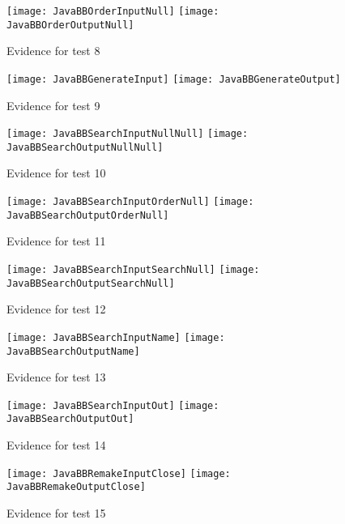 \documentclass[
11pt, %
a4paper, %
oneside, %
headinclude,footinclude, %
BCOR5mm, %
]{scrartcl}
\begin{document}
\begin{appendices}
{{{{{{{{{{{{{{\begin{figure}[H]
	\label{javabbtes7}	
\end{figure}
\begin{figure}[H]
	\centering
	\texttt{[image: JavaBBOrderInputNull]}
	\texttt{[image: JavaBBOrderOutputNull]}
	\caption[Evidence C.2.1 Test 8]{Evidence for test 8}
	\label{javabbtes8}	
\end{figure}
\begin{figure}[H]
	\centering
	\texttt{[image: JavaBBGenerateInput]}
	\texttt{[image: JavaBBGenerateOutput]}
	\caption[Evidence C.2.1 Test 9]{Evidence for test 9}
	\label{javabbtes9}	
\end{figure}
\begin{figure}[H]
	\centering
	\texttt{[image: JavaBBSearchInputNullNull]}
	\texttt{[image: JavaBBSearchOutputNullNull]}
	\caption[Evidence C.2.1 Test 10]{Evidence for test 10}
	\label{javabbtes10}	
\end{figure}
\begin{figure}[H]
	\centering
	\texttt{[image: JavaBBSearchInputOrderNull]}
	\texttt{[image: JavaBBSearchOutputOrderNull]}
	\caption[Evidence C.2.1 Test 11]{Evidence for test 11}
	\label{javabbtes11}	
\end{figure}
\begin{figure}[H]
	\centering
	\texttt{[image: JavaBBSearchInputSearchNull]}
	\texttt{[image: JavaBBSearchOutputSearchNull]}
	\caption[Evidence C.2.1 Test 12]{Evidence for test 12}
	\label{javabbtes12}	
\end{figure}
\begin{figure}[H]
	\centering
	\texttt{[image: JavaBBSearchInputName]}
	\texttt{[image: JavaBBSearchOutputName]}
	\caption[Evidence C.2.1 Test 13]{Evidence for test 13}
	\label{javabbtes13}	
\end{figure}
\begin{figure}[H]
	\centering
	\texttt{[image: JavaBBSearchInputOut]}
	\texttt{[image: JavaBBSearchOutputOut]}
	\caption[Evidence C.2.1 Test 14]{Evidence for test 14}
	\label{javabbtes14}	
\end{figure}
\begin{figure}[H]
	\centering
	\texttt{[image: JavaBBRemakeInputClose]}
	\texttt{[image: JavaBBRemakeOutputClose]}
	\caption[Evidence C.2.1 Test 15]{Evidence for test 15}
	\label{javabbtes15}	
\end{figure}
\begin{figure}[H]

\end{figure}}}}}}}}}}}}}}}
\end{appendices}
\end{document}
